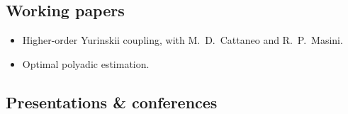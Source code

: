 \documentclass{wgu-cv}
\begin{document}
\pagebreak

\subsection{Working papers}{}
\begin{itemize}

  \item Higher-order Yurinskii coupling,
    with M.\ D.\ Cattaneo and R.\ P.\ Masini.

  \item Optimal polyadic estimation.

\end{itemize}

\subsection{Presentations \& conferences}{}
\end{document}
